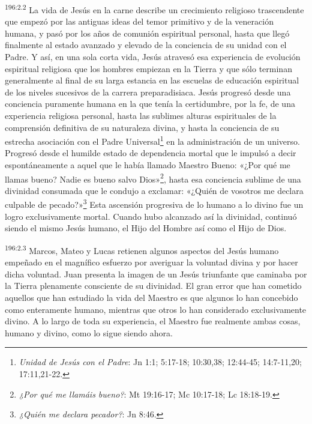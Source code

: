 \par
\textsuperscript{196:2.2} La vida de Jesús en la carne describe un crecimiento religioso trascendente que empezó por las antiguas ideas del temor primitivo y de la veneración humana, y pasó por los años de comunión espiritual personal, hasta que llegó finalmente al estado avanzado y elevado de la conciencia de su unidad con el Padre. Y así, en una sola corta vida, Jesús atravesó esa experiencia de evolución espiritual religiosa que los hombres empiezan en la Tierra y que sólo terminan generalmente al final de su larga estancia en las escuelas de educación espiritual de los niveles sucesivos de la carrera preparadisiaca. Jesús progresó desde una conciencia puramente humana en la que tenía la certidumbre, por la fe, de una experiencia religiosa personal, hasta las sublimes alturas espirituales de la comprensión definitiva de su naturaleza divina, y hasta la conciencia de su estrecha asociación con el Padre Universal\footnote{\textit{Unidad de Jesús con el Padre}: Jn 1:1; 5:17-18; 10:30,38; 12:44-45; 14:7-11,20; 17:11,21-22.} en la administración de un universo. Progresó desde el humilde estado de dependencia mortal que le impulsó a decir espontáneamente a aquel que le había llamado Maestro Bueno: «¿Por qué me llamas bueno? Nadie es bueno salvo Dios»\footnote{\textit{¿Por qué me llamáis bueno?}: Mt 19:16-17; Mc 10:17-18; Lc 18:18-19.}, hasta esa conciencia sublime de una divinidad consumada que le condujo a exclamar: «¿Quién de vosotros me declara culpable de pecado?»\footnote{\textit{¿Quién me declara pecador?}: Jn 8:46.} Esta ascensión progresiva de lo humano a lo divino fue un logro exclusivamente mortal. Cuando hubo alcanzado así la divinidad, continuó siendo el mismo Jesús humano, el Hijo del Hombre así como el Hijo de Dios.

\par
\textsuperscript{196:2.3} Marcos, Mateo y Lucas retienen algunos aspectos del Jesús humano empeñado en el magnífico esfuerzo por averiguar la voluntad divina y por hacer dicha voluntad. Juan presenta la imagen de un Jesús triunfante que caminaba por la Tierra plenamente consciente de su divinidad. El gran error que han cometido aquellos que han estudiado la vida del Maestro es que algunos lo han concebido como enteramente humano, mientras que otros lo han considerado exclusivamente divino. A lo largo de toda su experiencia, el Maestro fue realmente ambas cosas, humano y divino, como lo sigue siendo ahora.

